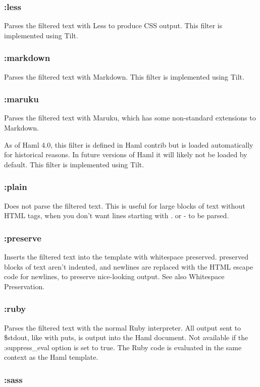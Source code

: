 \documentclass[10pt]{article}
\begin{document}
\subsubsection*{:less}


 Parses the filtered text with Less to produce CSS output. This filter is implemented using Tilt.
\subsubsection*{:markdown}


 Parses the filtered text with Markdown. This filter is implemented using Tilt.
\subsubsection*{:maruku}


 Parses the filtered text with Maruku, which has some non-standard extensions to Markdown.


 As of Haml 4.0, this filter is defined in Haml contrib but is loaded automatically for historical reasons. In future versions of Haml it will likely not be loaded by default. This filter is implemented using Tilt.
\subsubsection*{:plain}


 Does not parse the filtered text. This is useful for large blocks of text without HTML tags, when you don’t want lines starting with . or - to be parsed.
\subsubsection*{:preserve}


 Inserts the filtered text into the template with whitespace preserved. preserved blocks of text aren’t indented, and newlines are replaced with the HTML escape code for newlines, to preserve nice-looking output. See also Whitespace Preservation.
\subsubsection*{:ruby}


 Parses the filtered text with the normal Ruby interpreter. All output sent to \$stdout, like with puts, is output into the Haml document. Not available if the :suppress\_eval option is set to true. The Ruby code is evaluated in the same context as the Haml template.
\subsubsection*{:sass}
\end{document}
